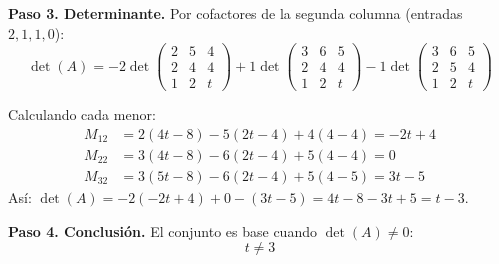 \begin{prob}
\begin{myproof}
\textbf{Paso 3. Determinante.} Por cofactores de la segunda columna (entradas $2,1,1,0$):
$$\det(A) = -2\det\begin{pmatrix}2&5&4\\2&4&4\\1&2&t\end{pmatrix} + 1\det\begin{pmatrix}3&6&5\\2&4&4\\1&2&t\end{pmatrix} - 1\det\begin{pmatrix}3&6&5\\2&5&4\\1&2&t\end{pmatrix}$$

Calculando cada menor:
\begin{align*}
M_{12} &= 2(4t-8)-5(2t-4)+4(4-4) = -2t+4\\
M_{22} &= 3(4t-8)-6(2t-4)+5(4-4) = 0\\
M_{32} &= 3(5t-8)-6(2t-4)+5(4-5) = 3t-5
\end{align*}
Así: $\det(A) = -2(-2t+4) + 0 - (3t-5) = 4t-8-3t+5 = t-3$.

\textbf{Paso 4. Conclusión.} El conjunto es base cuando $\det(A) \neq 0$:
$$\boxed{t \neq 3}$$
\end{myproof}
\end{prob}

